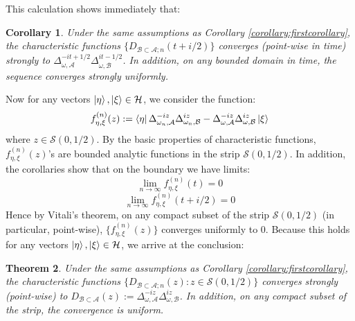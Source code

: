 \documentclass[a4paper,11pt]{article}
\newtheorem{theorem}{Theorem}
\newtheorem{corollary}[theorem]{Corollary}
\theoremstyle{definition}
\begin{document}
This calculation shows immediately that:
\begin{corollary}
    Under the same assumptions as Corollary \ref{corollary:firstcorollary}, the characteristic functions $\{D_{\mathcal{B}\subset \mathcal{A};n}(t+i/2)\}$ converges (point-wise in time) strongly to $\Delta_{\omega,\mathcal{A}}^{-it + 1/2}\Delta_{\omega, \mathcal{B}}^{it - 1/2}$. In addition, on any bounded domain in time, the sequence converges strongly uniformly.
\end{corollary}
Now for any vectors $\ket{\eta}, \ket{\xi}\in\mathcal{H}$, we consider the function:
\begin{equation}
    f^{(n)}_{\eta,\xi}(z) := \bra{\eta}\Delta^{-iz}_{\omega_n,\mathcal{A}}\Delta^{iz}_{\omega_n, \mathcal{B}} - \Delta^{-iz}_{\omega,\mathcal{A}}\Delta^{iz}_{\omega,\mathcal{B}}\ket{\xi}
\end{equation}
where $z\in\mathcal{S}(0,1/2)$. By the basic properties of characteristic functions, $f^{(n)}_{\eta,\xi}(z)$'s are bounded analytic functions in the strip $\mathcal{S}(0, 1/2)$. In addition, the corollaries show that on the boundary we have limits:
\begin{equation}
    \lim_{n\rightarrow\infty}f^{(n)}_{\eta,\xi}(t) = 0
\end{equation}
\begin{equation}
    \lim_{n\rightarrow\infty}f^{(n)}_{\eta, \xi}(t +i/2) = 0
\end{equation}
Hence by Vitali's theorem, on any compact subset of the strip $\mathcal{S}(0, 1/2)$ (in particular, point-wise), $\{f^{(n)}_{\eta,\xi}(z)\}$ converges uniformly to $0$. Because this holds for any vectors $\ket{\eta}, \ket{\xi}\in\mathcal{H}$, we arrive at the conclusion:
\begin{theorem}
    Under the same assumptions as Corollary \ref{corollary:firstcorollary}, the characteristic functions $\{D_{\mathcal{B}\subset \mathcal{A};n}(z):z\in\mathcal{S}(0, 1/2)\}$ converges strongly (point-wise) to $D_{\mathcal{B}\subset \mathcal{A}}(z):=\Delta_{\omega,\mathcal{A}}^{-iz}\Delta_{\omega,\mathcal{B}}^{iz}$. In addition, on any compact subset of the strip, the convergence is uniform.
\end{theorem}
\end{document}
